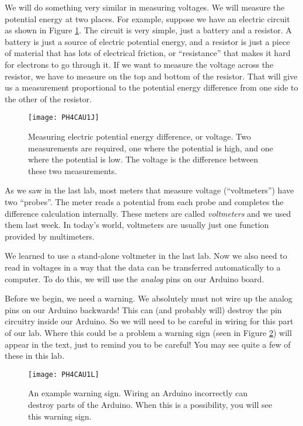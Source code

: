 We will do something very similar in measuring voltages. We will measure the
potential energy at two places. For example, suppose we have an electric
circuit as shown in Figure \ref{fig:voltage_measurement}. 
The circuit is very simple, just
a battery and a resistor. A battery is just a source of electric potential 
energy, and a resistor is just a piece of material that has lots of electrical
friction, or ``resistance'' that makes it
hard for electrons to go through it. If we want to measure the voltage
across the resistor, we have to measure on the top and bottom of the
resistor. That will give us a measurement proportional to the potential
energy difference from one side to the other of the resistor.
\begin{figure}[htbp!]
\centering
\texttt{[image: PH4CAU1J]}
\caption[Measuring electric potential energy difference]{Measuring electric
potential energy difference, or voltage. Two measurements are required,
one where the potential is high, and one where the potential is low. 
The voltage is the difference between these two measurements.}
\label{fig:voltage_measurement}
\end{figure}

As we saw in the last lab, most meters that measure voltage (``voltmeters'')
have 
two ``probes''. The meter reads a potential from each probe and completes
the difference calculation internally.
These meters are called \emph{voltmeters} and we used them last week.
In today's world, voltmeters are usually just one function provided by
multimeters.

We learned to use a stand-alone voltmeter in the last lab. Now we also need
to read in voltages in a way that the data can be transferred automatically
to a computer. To do this, we will use the \emph{analog} pins on our
Arduino board.

Before we begin, we need a warning. We absolutely must not wire up the
analog pins on our Arduino backwards! This can (and probably will) destroy
the pin circuitry inside our Arduino. So we will need to be careful in
wiring for this part of our lab. Where this could be a problem a warning
sign (seen in Figure \ref{fig:warning}) will appear in the text, 
just to remind you to be careful! 
You may see quite a few of these in this lab.
\begin{figure}[htbp!]
\centering
\texttt{[image: PH4CAU1L]}
\caption[Example warning sign]{An example warning sign. Wiring an
Arduino incorrectly can destroy parts of the Arduino. When this is
a possibility, you will see this warning sign.}
\label{fig:warning}
\end{figure}

